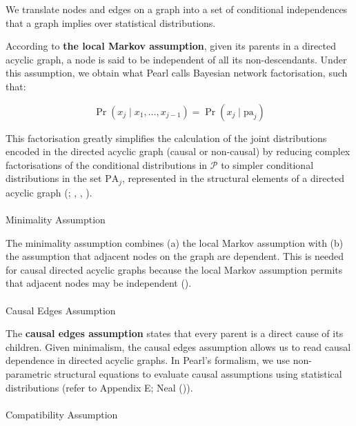 \documentclass[
  single column]{article}
\makeatletter
\let\oldparagraph\paragraph
\renewcommand{\paragraph}{
    \@ifstar
      \xxxParagraphStar
      \xxxParagraphNoStar
  }
\newcommand{\xxxParagraphStar}[1]{\oldparagraph*{#1}\mbox{}}
\newcommand{\xxxParagraphNoStar}[1]{\oldparagraph{#1}\mbox{}}
\makeatother
\begin{document}
We translate nodes and edges on a graph into a set of conditional
independences that a graph implies over statistical distributions.

According to \textbf{the local Markov assumption}, given its parents in
a directed acyclic graph, a node is said to be independent of all its
non-descendants. Under this assumption, we obtain what Pearl calls
Bayesian network factorisation, such that:

\[
\Pr(x_j \mid x_1, \dots, x_{j-1}) = \Pr(x_j \mid \text{pa}_j)
\]

This factorisation greatly simplifies the calculation of the joint
distributions encoded in the directed acyclic graph (causal or
non-causal) by reducing complex factorisations of the conditional
distributions in \(\mathcal{P}\) to simpler conditional distributions in
the set \(\text{PA}_j\), represented in the structural elements of a
directed acyclic graph (; ,
, ).

\paragraph{Minimality Assumption}\label{minimality-assumption}

The minimality assumption combines (a) the local Markov assumption with
(b) the assumption that adjacent nodes on the graph are dependent. This
is needed for causal directed acyclic graphs because the local Markov
assumption permits that adjacent nodes may be independent
().

\paragraph{Causal Edges Assumption}\label{causal-edges-assumption}

The \textbf{causal edges assumption} states that every parent is a
direct cause of its children. Given minimalism, the causal edges
assumption allows us to read causal dependence in directed acyclic
graphs. In Pearl's formalism, we use non-parametric structural equations
to evaluate causal assumptions using statistical distributions (refer to
Appendix E; Neal ()).

\paragraph{Compatibility Assumption}\label{compatibility-assumption}
\end{document}

